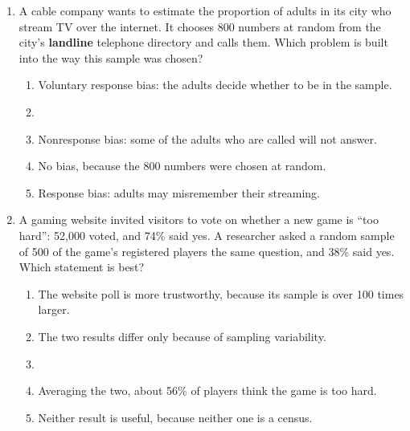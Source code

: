 \documentclass[12pt]{article}
\begin{document}
\begin{enumerate}[leftmargin=1.9em, itemsep=0.13in]
  \boxguard[14]
  \item A cable company wants to estimate the proportion of adults in its city who stream TV
        over the internet. It chooses 800 numbers at random from the city's \textbf{landline}
        telephone directory and calls them. Which problem is built into the way this sample was
        chosen?
        \begin{enumerate}[label=\textbf{(\Alph*)}, leftmargin=2.2em, itemsep=2pt]
          \item Voluntary response bias: the adults decide whether to be in the sample.
          \item {}
          \item Nonresponse bias: some of the adults who are called will not answer.
          \item No bias, because the 800 numbers were chosen at random.
          \item Response bias: adults may misremember their streaming.\hfill{}\rule[-0.2in]{0pt}{0.48in}
        \end{enumerate}

  \boxguard[14]
  \item A gaming website invited visitors to vote on whether a new game is ``too hard'':
        52{,}000 voted, and 74\% said yes. A researcher asked a random sample of 500 of the
        game's registered players the same question, and 38\% said yes. Which statement is
        best?
        \begin{enumerate}[label=\textbf{(\Alph*)}, leftmargin=2.2em, itemsep=2pt]
          \item The website poll is more trustworthy, because its sample is over 100 times larger.
          \item The two results differ only because of sampling variability.
          \item {}
          \item Averaging the two, about 56\% of players think the game is too hard.
          \item Neither result is useful, because neither one is a census.\hfill{}\rule[-0.2in]{0pt}{0.48in}
        \end{enumerate}


\end{enumerate}
\end{document}
